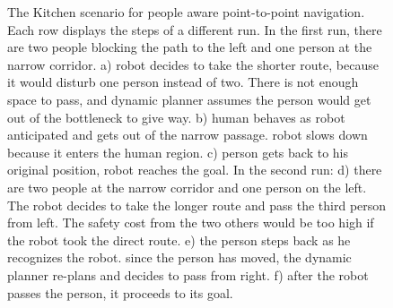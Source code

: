 \begin{figure}[p!]
{        }%
        
    \caption{%
	The Kitchen scenario for people aware point-to-point navigation. Each row displays the steps of a different run. In the first run, there are two people blocking the path to the left and one person at the narrow corridor. a) robot decides to take the shorter route, because it would disturb one person instead of two. There is not enough space to pass, and dynamic planner assumes the person would get out of the bottleneck to give way. b) human behaves as robot anticipated and gets out of the narrow passage. robot slows down because it enters the human region. c) person gets back to his original position, robot reaches the goal. In the second run: d) there are two people at the narrow corridor and one person on the left. The robot decides to take the longer route and pass the third person from left. The safety cost from the two others would be too high if the robot took the direct route. e) the person steps back as he recognizes the robot. since the person has moved, the dynamic planner re-plans and decides to pass from right. f) after the robot passes the person, it proceeds to its goal.
     }%
   \label{fig:kitchen}
\end{figure}


